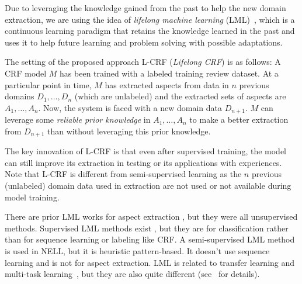 \documentclass[11pt,a4paper]{article}
\theoremstyle{definition}
\begin{document}


Due to leveraging the knowledge gained from the past to help the new domain extraction, we are using the idea of {\em lifelong machine learning} (LML)~\cite{ChenLiu2016,thrun1998lifelong,silver2013lifelong}, which is a continuous learning paradigm that retains the knowledge learned in the past and uses it to help future learning and problem solving with possible adaptations. %

The setting of the proposed approach L-CRF ({\em Lifelong CRF}) is as follows: A CRF model $M$ has been trained with a labeled training review dataset. At a particular point in time, $M$ has extracted aspects from data in $n$ previous domains $D_1, \dots, D_n$ (which are unlabeled) and the extracted sets of aspects are $A_1, \dots, A_n$. Now, the system is faced with a new domain data $D_{n+1}$.  $M$ can leverage some {\em reliable prior knowledge} in $A_1, \dots, A_n$ to make a better extraction from $D_{n+1}$ than without leveraging this prior knowledge. 

The key innovation of L-CRF is that even after supervised training, the model can still improve its extraction in testing or its applications with experiences. Note that L-CRF is different from semi-supervised learning \cite{zhu2005semi} as the $n$ previous (unlabeled) domain data used in extraction are not used or not available during model training.

There are prior LML works for aspect extraction \cite{ChenZhiyuan2014ACL,liu2016improving}, but they were all unsupervised methods. Supervised LML methods exist \cite{chen2015lifelong,ruvolo2013ella}, but they are for classification rather than for sequence learning or labeling like CRF. A semi-supervised LML method is used in NELL\cite{mitchell2015}, but it is heuristic pattern-based. It doesn't use sequence learning and is not for aspect extraction. LML is related to transfer learning and multi-task learning~\cite{pan2010survey}, but they are also quite different (see~\cite{ChenLiu2016} for details).
\end{document}

